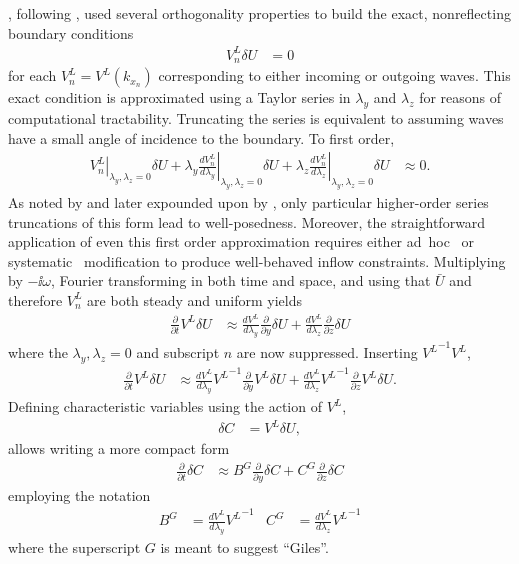 \citeauthor{Giles1988Nonreflecting}, following
\citeauthor{Engquist1977Absorbing}, used several orthogonality properties to
build the exact, nonreflecting boundary conditions
\begin{align}
\label{eq:dimeulerexact}
  V_n^L \delta{}U &= 0
\end{align}
for each $V_n^L = V^L\!\left(k_{x_n}\right)$ corresponding to either
incoming or outgoing waves.  This exact condition is approximated using a
Taylor series in $\lambda_y$ and $\lambda_z$ for reasons of computational
tractability.  Truncating the series is equivalent to assuming waves have a
small angle of incidence to the boundary.  To first order,
\begin{align}
  \left.V_n^L\right|_{\lambda_y,\lambda_z=0}
  \delta{}U
  +
  \lambda_y
  \left.\frac{dV_n^L}{d\lambda_y}\right|_{\lambda_y,\lambda_z=0}
  \delta{}U
  +
  \lambda_z
  \left.\frac{dV_n^L}{d\lambda_z}\right|_{\lambda_y,\lambda_z=0}
  \delta{}U
  &\approx 0.
\end{align}
As noted by \citet{Engquist1977Absorbing} and later expounded upon by
\citet{Trefethen1986Wellposedness}, only particular higher-order series
truncations of this form lead to well-posedness.  Moreover, the straightforward
application of even this first order approximation requires either
ad~hoc~\citep{Giles1988Nonreflecting,Medida2007} or
systematic~\citep{Rowley2000Discretely} modification to produce well-behaved
inflow constraints.  Multiplying by $-\ii\omega$, Fourier transforming
in both time and space, and using that $\bar{U}$ and therefore $V_n^L$ are both
steady and uniform yields
\begin{align}
\label{eq:dimeulerapprox}
  \frac{\partial\!}{\partial\!t}
  V^L
  \delta{}U
  &\approx
  \frac{dV^L}{d\lambda_y}
  \frac{\partial\!}{\partial\!y}\delta{}U
  +
  \frac{dV^L}{d\lambda_z}
  \frac{\partial\!}{\partial\!z}\delta{}U
\end{align}
where the $\lambda_y,\lambda_z=0$ and subscript $n$ are now
suppressed.  Inserting ${V^L}^{-1} V^L$,
\begin{align}
  \frac{\partial\!}{\partial\!t}
  V^L
  \delta{}U
  &\approx
  \frac{dV^L}{d\lambda_y}
  {V^L}^{-1}
  \frac{\partial\!}{\partial\!y}
  V^L
  \delta{}U
  +
  \frac{dV^L}{d\lambda_z}
  {V^L}^{-1}
  \frac{\partial\!}{\partial\!z}
  V^L
  \delta{}U.
\end{align}
Defining characteristic variables using the action of $V^L$,
\begin{align}
  \delta{}C &= V^L \delta{}U
  ,
\end{align}
allows writing a more compact form
\begin{align}
  \label{eq:dimeulerapproxcompact}
  \frac{\partial\!}{\partial\!t}
  \delta{}C
  &\approx
  B^G
  \frac{\partial\!}{\partial\!y}
  \delta{}C
  +
  C^G
  \frac{\partial\!}{\partial\!z}
  \delta{}C
\end{align}
employing the notation
\begin{align}
  B^G
&=
  \frac{dV^L}{d\lambda_y}
  {V^L}^{-1}
&
  C^G
&=
  \frac{dV^L}{d\lambda_z}
  {V^L}^{-1}
\end{align}
where the superscript $G$ is meant to suggest ``Giles''.

